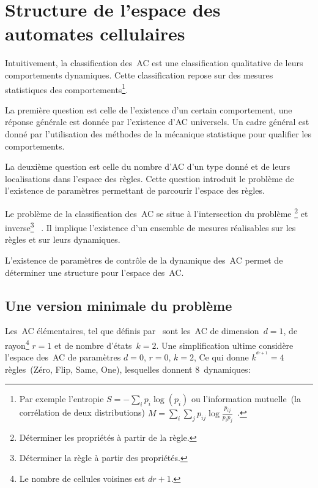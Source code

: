 \chapter[Structure de l'espace des AC]%
{Structure de l'espace des automates cellulaires}

Intuitivement, la classification des~AC est une classification
qualitative de leurs comportements dynamiques. %
Cette classification repose sur des mesures statistiques des
comportements\footnote{%
  Par exemple l'entropie %
  $S = - \sum_{i} p_{i} \log(p_{i})$ %
  ou l'information mutuelle~(la corr\'elation de deux distributions) %
  $M = \sum_{i} \sum_{j} p_{ij} \log \frac{p_{ij}}{p_{i} p_{j}}$~\cite[]{Li90b}.}. %

La premi\`ere question est celle de l'existence d'un certain
comportement, une r\'eponse g\'en\'erale est donn\'ee par l'existence d'AC
universels. %
Un cadre g\'en\'eral est donn\'e par l'utilisation des m\'ethodes de la
m\'ecanique statistique pour qualifier les comportements. %

La deuxi\`eme question est celle du nombre d'AC d'un type donn\'e et de
leurs localisations dans l'espace des r\`egles. %
Cette question introduit le probl\`eme de l'existence de param\`etres
permettant de parcourir l'espace des r\`egles. %

Le probl\`eme de la classification des~AC se situe \`a l'intersection du
probl\`eme \footnote{%
  D\'eterminer les propri\'et\'es \`a partir de la r\`egle.} %
et inverse\footnote{%
  D\'eterminer la r\`egle \`a partir des propri\'et\'es.}~%
\cite[]{Gutowitz90a}. %
Il implique l'existence d'un ensemble de mesures r\'ealisables sur les
r\`egles et sur leurs dynamiques. %

L'existence de param\`etres de contr\^ole de la dynamique des~AC permet
de d\'eterminer une structure pour l'espace des~AC. %

\section{Une version minimale du probl\`eme}

Les~AC \'el\'ementaires, tel que d\'efinis par~\cite{Wolfram86a}
sont les~AC de dimension~$d = 1$, de rayon\footnote{%
  Le nombre de cellules voisines est $d r + 1$.} %
$r = 1$ et de nombre d'\'etats~$k = 2$. %
Une simplification ultime consid\`ere l'espace des~AC de param\`etres %
$d = 0$, $r = 0$, $k = 2$, %
Ce qui donne $k^{^{d r + 1}} = 4$ r\`egles~(Z\'ero, Flip, Same, One),
lesquelles donnent 8~dynamiques:

